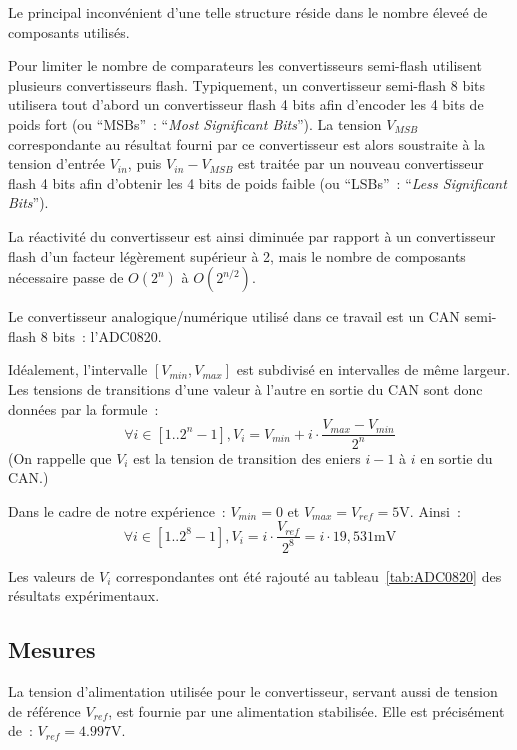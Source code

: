 \documentclass{article}
\begin{document}
Le principal inconvénient d'une telle structure réside dans le nombre éleveé de composants utilisés. 

Pour limiter le nombre de comparateurs les convertisseurs semi-flash utilisent plusieurs convertisseurs flash. Typiquement, un convertisseur semi-flash 8 bits utilisera tout d'abord un convertisseur flash 4 bits afin d'encoder les 4 bits de poids fort (ou ``MSBs''~: ``\textit{Most Significant Bits}''). La tension $V_{MSB}$ correspondante au résultat fourni par ce convertisseur est alors soustraite à la tension d'entrée $V_{in}$, puis $V_{in}-V_{MSB}$ est traitée par un nouveau convertisseur flash 4 bits afin d'obtenir les 4 bits de poids faible (ou ``LSBs''~: ``\textit{Less Significant Bits}'').

La réactivité du convertisseur est ainsi diminuée par rapport à un convertisseur flash d'un facteur légèrement supérieur à 2, mais le nombre de composants nécessaire passe de $O(2^n)$ à $O(2^{n/2})$.

Le convertisseur analogique/numérique utilisé dans ce travail est un CAN semi-flash 8 bits~: l'ADC0820.



Idéalement, l'intervalle $[V_{min},V_{max}]$ est subdivisé en intervalles de même largeur. Les tensions de transitions d'une valeur à l'autre en sortie du CAN sont donc données par la formule~:
\begin{equation*}
\forall i\in[1..2^n-1], V_i = V_{min}+i\cdot\frac{V_{max}-V_{min}}{2^n}
\end{equation*}
(On rappelle que $V_i$ est la tension de transition des eniers $i-1$ à $i$ en sortie du CAN.)

Dans le cadre de notre expérience~: $V_{min}=0$ et $V_{max}=V_{ref}=\mathrm{5 V}$. Ainsi~:
\begin{equation*}
\forall i\in[1..2^8-1], V_i = i\cdot\frac{V_{ref}}{2^8} = i\cdot \mathrm{19,531 mV}
\end{equation*}

Les valeurs de $V_i$ correspondantes ont été rajouté au tableau~\ref{tab:ADC0820} des résultats expérimentaux.


\subsection{Mesures}


La tension d'alimentation utilisée pour le convertisseur, servant aussi de tension de référence $V_{ref}$, est fournie par une alimentation stabilisée. Elle est précisément de~: ${V_{ref}=\mathrm{4.997 V}}$.
\end{document}
